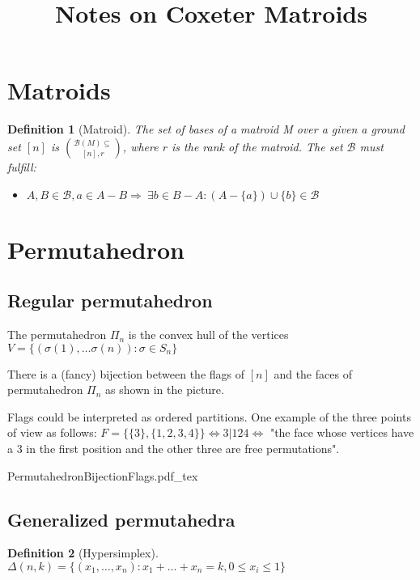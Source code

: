 \documentclass{myclass}
\title{Notes on Coxeter Matroids}
\newtheorem*{definition}{Definition}
\newcommand{\incfig}[1]{%
\center
\def\svgwidth{0.9\columnwidth}
{#1.pdf_tex}
}
\begin{document}
\maketitle
\tableofcontents
\newpage

\section{Matroids}
\begin{definition}[Matroid]
The set of bases of a matroid M over a given a ground set $[n]$ is $\mathcal{B}(M)\subseteq \choose{[n], r}$, where $r$ is the rank of the matroid. The set  $\mathcal{B}$ must fulfill:
\begin{itemize}[topsep=-6pt, itemsep=0pt]
  \item $A, B \in \mathcal{B}, a\in A-B \Rightarrow \ \exists b\in B-A : (A-\{a\})\cup \{b\}\in \mathcal{B}$
\end{itemize}
\end{definition}

\section{Permutahedron}
\subsection{Regular permutahedron}
The permutahedron $\Pi_n$ is the convex hull of the vertices $V = \{(\sigma(1), \ldots \sigma (n)) : \sigma \in S_n \}$

There is a (fancy) bijection between the flags of $[n]$ and the faces of permutahedron $\Pi_n$ as shown in the picture.

Flags could be interpreted as ordered partitions. One example of the three points of view as follows: $F = \{\{3\}, \{1, 2, 3, 4\}\} \iff 3|124 \iff$ "the face whose vertices have a $3$ in the first position and the other three are free permutations".

\begin{minipage}{\textwidth}
\incfig{PermutahedronBijectionFlags}
\end{minipage}

\subsection{Generalized permutahedra}

\begin{definition}[Hypersimplex] 
  $\Delta(n, k)=\{(x_1, \ldots, x_n): x_1 + \ldots+ x_n = k, 0\le x_i\le 1\}$
\end{definition}
\end{document}
